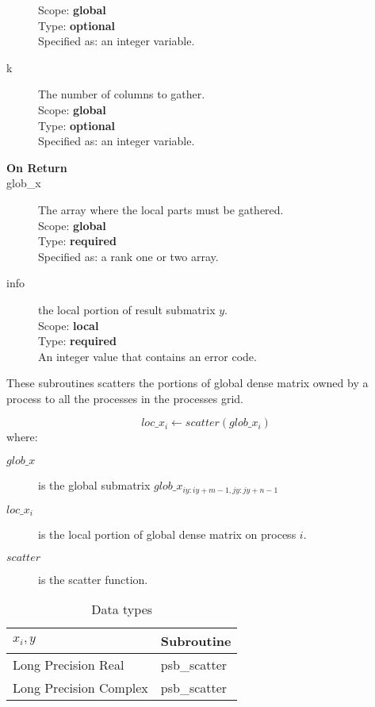 \begin{description}
Scope: {\bf global} \\
Type: {\bf optional}\\
Specified as: an integer variable.
\item[k]  The number of columns to gather.\\
Scope: {\bf global} \\
Type: {\bf optional}\\
Specified as: an integer variable. 
\item[\bf On Return] 
\item[glob\_x] The array where the local parts must be gathered.\\
Scope: {\bf global} \\
Type: {\bf required}\\
Specified as: a rank one or two array.
\item[info] the local portion of result submatrix $y$.\\
Scope: {\bf local} \\
Type: {\bf required} \\
An integer value that contains an error code. 
\end{description}

%
%


These subroutines scatters the portions of global dense matrix owned
by a process to all the processes in the processes grid.

\[ loc\_x_i \leftarrow scatter(glob\_x_i) \]
where:
\begin{description}
\item[$glob\_x$] is the global submatrix $glob\_x_{iy:iy+m-1,jy:jy+n-1}$
\item[$loc\_x_i$] is the local portion of global dense matrix on
process $i$.
\item[$scatter$] is the scatter function.
\end{description}

\begin{table}[h]
\begin{center}
\begin{tabular}{ll}
\hline
$x_i, y$ & {\bf Subroutine}\\
\hline
Long Precision Real & psb\_scatter \\
Long Precision Complex & psb\_scatter \\
\hline
\end{tabular}
\end{center}
\caption{Data types\label{tab:scatter}}
\end{table}


